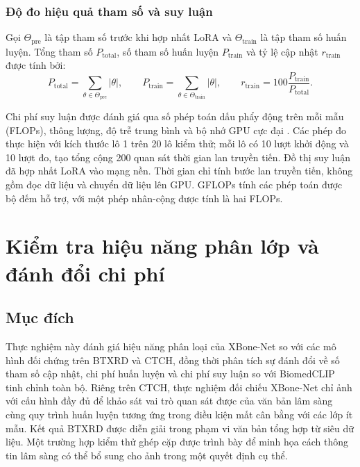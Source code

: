 \subsubsection{Độ đo hiệu quả tham số và suy luận}

Gọi $\Theta_{\mathrm{pre}}$ là tập tham số trước khi hợp nhất LoRA và $\Theta_{\mathrm{train}}$ là tập tham số huấn luyện. Tổng tham số $P_{\mathrm{total}}$, số tham số huấn luyện $P_{\mathrm{train}}$ và tỷ lệ cập nhật $r_{\mathrm{train}}$ được tính bởi:
\begin{equation}
P_{\mathrm{total}}=\sum_{\theta\in\Theta_{\mathrm{pre}}}|\theta|,
\qquad
P_{\mathrm{train}}=\sum_{\theta\in\Theta_{\mathrm{train}}}|\theta|,
\qquad
r_{\mathrm{train}}=100\frac{P_{\mathrm{train}}}{P_{\mathrm{total}}}.
\label{eq:ch4_trainable_parameter_ratio}
\end{equation}

Chi phí suy luận được đánh giá qua số phép toán dấu phẩy động trên mỗi mẫu (FLOPs), thông lượng, độ trễ trung bình và bộ nhớ GPU cực đại \cite{Canziani2017PracticalDNN,Reddi2020MLPerfInference}. Các phép đo thực hiện với kích thước lô 1 trên 20 lô kiểm thử; mỗi lô có 10 lượt khởi động và 10 lượt đo, tạo tổng cộng 200 quan sát thời gian lan truyền tiến. Đồ thị suy luận đã hợp nhất LoRA vào mạng nền. Thời gian chỉ tính bước lan truyền tiến, không gồm đọc dữ liệu và chuyển dữ liệu lên GPU. GFLOPs tính các phép toán được bộ đếm hỗ trợ, với một phép nhân-cộng được tính là hai FLOPs.

\section{Kiểm tra hiệu năng phân lớp và đánh đổi chi phí}
\label{sec:data_cost_performance}

\subsection{Mục đích}
Thực nghiệm này đánh giá hiệu năng phân loại của XBone-Net so với các mô hình đối chứng trên BTXRD và CTCH, đồng thời phân tích sự đánh đổi về số tham số cập nhật, chi phí huấn luyện và chi phí suy luận so với BiomedCLIP tinh chỉnh toàn bộ. Riêng trên CTCH, thực nghiệm đối chiếu XBone-Net chỉ ảnh với cấu hình đầy đủ để khảo sát vai trò quan sát được của văn bản lâm sàng cùng quy trình huấn luyện tương ứng trong điều kiện mất cân bằng với các lớp ít mẫu. Kết quả BTXRD được diễn giải trong phạm vi văn bản tổng hợp từ siêu dữ liệu. Một trường hợp kiểm thử ghép cặp được trình bày để minh họa cách thông tin lâm sàng có thể bổ sung cho ảnh trong một quyết định cụ thể.

